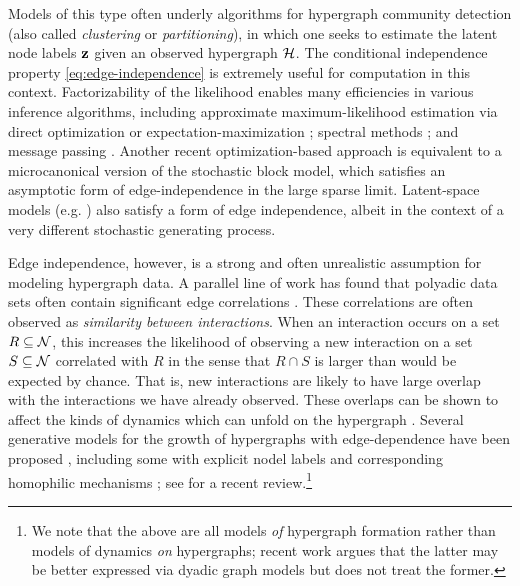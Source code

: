 \documentclass[aps,pre,reprint,superscriptaddress,nofootinbib]{revtex4-2}
\begin{document}
    Models of this type often underly algorithms for hypergraph community detection (also called \emph{clustering} or \emph{partitioning}), in which one seeks to estimate the latent node labels $\mathbf{z}$ given an observed hypergraph $\mathcal{H}$.
    The conditional independence property \eqref{eq:edge-independence} is extremely useful for computation in this context.  
    Factorizability of the likelihood enables many efficiencies in various inference algorithms, including approximate maximum-likelihood estimation via direct optimization \cite{chodrowGenerativeHypergraphClustering2021} or expectation-maximization \cite{ruggeriCommunityDetectionLarge2023}; spectral methods \cite{chodrowNonbacktrackingSpectralClustering2023,fernandez2026achieving,li2026higher}; and message passing \cite{ruggeri2024message}. 
    Another recent optimization-based approach \cite{kritschgauCommunityDetectionHypergraphs2024} is equivalent to a microcanonical version of the stochastic block model, which satisfies an asymptotic form of edge-independence in the large sparse limit.
    Latent-space models (e.g. \cite{yuModelingHypergraphsDiversity2025}) also satisfy a form of edge independence, albeit in the context of a very different stochastic generating process.
    
    Edge independence, however, is a strong and often unrealistic assumption for modeling hypergraph data. 
    A parallel line of work has found that polyadic data sets often contain significant edge correlations \cite{bensonSimplicialClosureHigherorder2018,landrySimplicialityHigherorderNetworks2024,leeHowHyperedgesOverlap2021}.
    These correlations are often observed as \emph{similarity between interactions}.
    When an interaction occurs on a set $R \subseteq \mathcal{N}$, this increases the likelihood of observing a new interaction on a set $S \subseteq \mathcal{N}$ correlated with $R$ in the sense that $R\cap S$ is larger than would be expected by chance. 
    That is, new interactions are likely to have large overlap with the interactions we have already observed.
    These overlaps can be shown to affect the kinds of dynamics which can unfold on the hypergraph \cite{maliziaHyperedgeOverlapDrives2025,lamata2025hyperedge}. 
    Several generative models for the growth of hypergraphs with edge-dependence have been proposed \cite{bensonSequencesSets2018,avinRandomPreferentialAttachment2019,heEdgeCorrelationsLink2025,leeTHyMeTemporalHypergraph2021,leeTemporalHypergraphMotifs2023}, including some with explicit nodel labels and corresponding homophilic mechanisms \cite{giroirePreferentialAttachmentHypergraph2022,giroirePreferentialAttachmentHypergraph2022a,kaminski2023hypergraph}; see \cite{laber2026guide} for a recent review.\footnote{We note that the above are all models \emph{of} hypergraph formation rather than models of dynamics \emph{on} hypergraphs; recent work argues that the latter may be better expressed via dyadic graph models \cite{peixoto2026graphs} but does not treat the former.}
\end{document}
